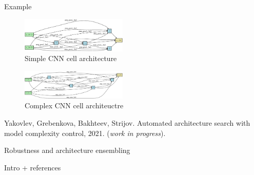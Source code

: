 \documentclass[usenames,dvipsnames,11pt,pdf,utf8,russian,aspectratio=169]{beamer}
\begin{document}
\begin{frame}{Example}
\vspace{-0.5cm}
\begin{multicols}{2}
\begin{figure}[h]
\includegraphics[width=0.45\textwidth]{./geno_2.eps}
\caption*{Simple CNN cell architecture}
\end{figure}

\begin{figure}[h]
\includegraphics[width=0.45\textwidth]{./geno_1.eps}
\caption*{Complex CNN cell architeuctre}
\end{figure}
\end{multicols}
{\footnotesize Yakovlev, Grebenkova, Bakhteev, Strijov. Automated architecture search with model complexity control, 2021. (\textit{work in progress}).}
\end{frame}
 




\begin{frame}
Robustness and architecture ensembling
\end{frame}

\begin{frame}
Intro + references
\end{frame}
\end{document}
